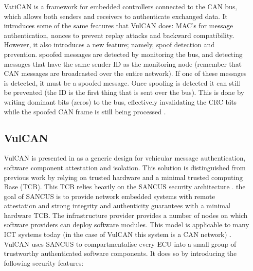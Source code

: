VatiCAN is a framework for embedded controllers connected to the CAN bus, which allows both senders and receivers to authenticate exchanged data. It introduces some of the same features that VulCAN does: MAC's for message authentication, nonces to prevent replay attacks and backward compatibility. However, it also introduces a new feature; namely, spoof detection and prevention. spoofed messages are detected by monitoring the bus, and detecting messages that have the same sender ID as the monitoring node (remember that CAN messages are broadcasted over the entire network). If one of these messages is detected, it must be a spoofed message. Once spoofing is detected it can still be prevented (the ID is the first thing that is sent over the bus). This is done by writing dominant bits (zeros) to the bus, effectively invalidating the CRC bits while the spoofed CAN frame is still being processed \cite{VatiCAN}.

\subsection{VulCAN}
\label{subsec:vulcan}

VulCAN is presented in \cite{VulCAN} as a generic design for vehicular message authentication, software component attestation and isolation. This solution is distinguished from previous work by relying on trusted hardware and a minimal trusted computing Base (TCB). This TCB relies heavily on the SANCUS security architecture \cite{Sancus}. the goal of SANCUS is to provide network embedded systems with remote attestation and strong integrity and authenticity guarantees with a minimal hardware TCB. The infrastructure provider provides a number of nodes on which software providers can deploy software modules. This model is applicable to many ICT systems today (in the case of VulCAN this system is a CAN network) \cite{Sancus}. VulCAN uses SANCUS to compartmentalise every ECU into a small group of trustworthy authenticated software components. It does so by introducing the following security features: 

